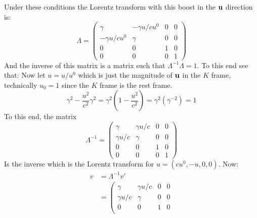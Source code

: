 \documentclass[12pt,a4]{article}
\begin{document}
\begin{enumerate}
\begin{enumerate}
        Under these conditions the Lorentz transform with this boost in the ${\bf u}$ direction is:
        \begin{equation*}
          \Lambda = \left(\begin{matrix}
                      \gamma          &         -\gamma u / cu^0 & 0 & 0\\ 
                      -\gamma u / cu^0 & \gamma                 & 0 & 0\\ 
                      0               & 0                      & 1 & 0\\ 
                      0               & 0                      & 0 & 1
                    \end{matrix}\right)
        \end{equation*}
        And the inverse of this matrix is a matrix such that $\Lambda^{-1}\Lambda = 1$. To this end see that:
        Now let $u = u / u^0$ which is just the magnitude of ${\bf u}$ in the $K$ frame, technically $u_0 = 1$ since the $K$ frame is the rest frame.
        \begin{equation*}
          \gamma^2 - \frac{u^2}{c^2} \gamma ^2 = \gamma^2(1 - \frac{u^2}{c^2}) = \gamma^2 (\gamma^{-2}) = 1
        \end{equation*}
        To this end, the matrix
        \begin{equation*}
          \Lambda^{-1} = \left(\begin{matrix}
                      \gamma         &        \gamma u / c & 0 & 0\\ 
                      \gamma u / c & \gamma                & 0 & 0\\ 
                      0              & 0                     & 1 & 0\\ 
                      0              & 0                     & 0 & 1
                    \end{matrix}\right)
        \end{equation*}
        Is the inverse which is the Lorentz transform for $u = (cu^0, - u, 0, 0)$.
        Now:
        \begin{align*}
          v &= \Lambda^{-1} v'\\
            & = \left(\begin{matrix}
                      \gamma         &        \gamma u / c & 0 & 0\\ 
                      \gamma u / c & \gamma                & 0 & 0\\ 
                      0              & 0                     & 1 & 0\\ 

\end{matrix}
\end{align*}
\end{enumerate}
\end{enumerate}
\end{document}
